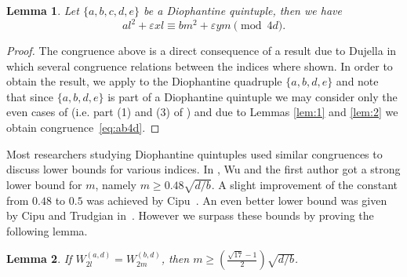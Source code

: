 \documentclass{amsart}
\newtheorem{lemma}{Lemma}
\theoremstyle{definition}
\begin{document}
\begin{lemma}\label{lem:cong_eq}
 Let $\{a,b,c,d,e\}$ be a Diophantine quintuple, then we have
\begin{equation}\label{eq:ab4d}
al^2 + \varepsilon xl \equiv bm^2 +\varepsilon ym\pmod{4d}.
\end{equation}
\end{lemma}

\begin{proof}
 The congruence above is a direct consequence of a result due to Dujella \cite[Lemma 4]{Dujella:2001}
 in which several congruence relations between the indices where shown. In order to obtain the result,
 we apply \cite[Lemma 4]{Dujella:2001} to the Diophantine quadruple $\{a,b,d,e\}$ and note that since $\{a,b,d,e\}$
 is part of a Diophantine quintuple we may consider only the even cases of \cite[Lemma 4]{Dujella:2001} (i.e. part (1) and (3) of \cite[Lemma 4]{Dujella:2001})
 and due to Lemmas \ref{lem:1} and \ref{lem:2} we obtain congruence~\eqref{eq:ab4d}.
\end{proof}

Most researchers studying Diophantine quintuples used similar congruences to discuss lower bounds for various indices.
In \cite{Wu-He:2014}, Wu and the first author got a strong lower bound for $m$, namely $m\ge 0.48 \sqrt{d/b}$. 
A slight improvement of the constant from $0.48$ to $0.5$ was achieved by Cipu~\cite{Cipu}. An even better lower bound was given by Cipu and Trudgian in~\cite{Cipu-Trudgian}.
However we surpass these bounds by proving the following lemma.   

\begin{lemma} \label{lem:mdb}
If $W^{(a,d)}_{2l} = W^{(b,d)}_{2m}$, then $m\ge \left(\frac{\sqrt{17}-1}{2}\right)\sqrt{d/b}$.  
\end{lemma}
\end{document}
